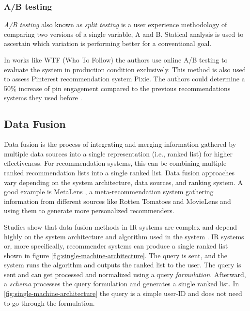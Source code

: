 \subsubsection{A/B testing}
\label{subsubsec:ab-testing}
\emph{A/B testing} also known as \emph{split testing} is a user experience methodology of comparing two versions of a single variable, A and B. Statical analysis is used to ascertain which variation is performing better for a conventional goal.

In works like WTF (Who To Follow) \cite{gupta2013wtf} the authors use online A/B testing to evaluate the system in production condition exclusively. This method is also used to assess Pinterest recommendation system Pixie. The authors could determine a 50\% increase of pin engagement compared to the previous recommendations systems they used before \cite{eksombatchai2018pixie}.


\subsection{Data Fusion}
Data fusion is the process of integrating and merging information gathered by multiple data sources into a single representation (i.e., ranked list) for higher effectiveness. For recommendation systems, this can be combining multiple ranked recommendation lists into a single ranked list. Data fusion approaches vary depending on the system architecture, data sources, and ranking system. A good example is MetaLens \cite{schafer2002meta}, a meta-recommendation system gathering information from different sources like Rotten Tomatoes and MovieLens and using them to generate more personalized recommenders.


Studies show that data fusion methods in IR systems are complex and depend highly on the system architecture and algorithm used in the system \cite{hsu2005comparing}. IR systems or, more specifically, recommender systems can produce a single ranked list shown in figure \ref{fig:single-machine-architecture}. The query is sent, and the system runs the algorithm and outputs the ranked list to the user. The query is sent and can get processed and normalized using a query \emph{formulation}. Afterward, a \emph{schema} processes the query formulation and generates a single ranked list. In \ref{fig:single-machine-architecture} the query is a simple user-ID and does not need to go through the formulation. 


